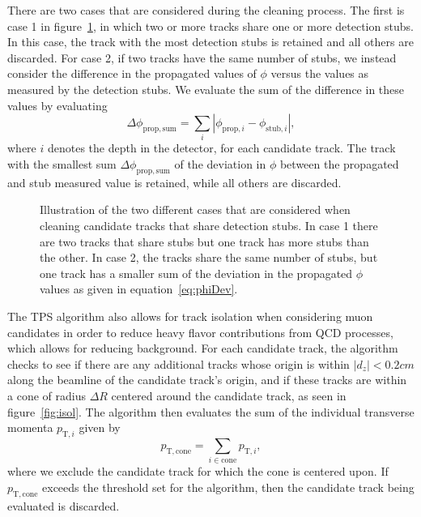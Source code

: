 There are two cases that are considered during the cleaning process.
The first is case 1 in figure~\ref{fig:clean}, in which two or more tracks share one or more detection stubs.
In this case, the track with the most detection stubs is retained and all others are discarded.
For case 2, if two tracks have the same number of stubs, we instead consider the difference in the propagated values of $\phi$ versus the values as measured by the detection stubs.
We evaluate the sum of the difference in these values by evaluating
\begin{equation}\label{eq:phiDev}
  \Delta\phi_{\mathrm{prop,sum}}=\sum_i|\phi_{\mathrm{prop},i}-\phi_{\mathrm{stub},i}|,
\end{equation}
where $i$ denotes the depth in the detector, for each candidate track.
The track with the smallest sum $\Delta\phi_{\mathrm{prop,sum}}$ of the deviation in $\phi$ between the propagated and stub measured value is retained, while all others are discarded.

\begin{figure}[htbp]
  \centering
  
  \caption{
    Illustration of the two different cases that are considered when cleaning candidate tracks that share detection stubs.
    In case 1 there are two tracks that share stubs but one track has more stubs than the other.
    In case 2, the tracks share the same number of stubs, but one track has a smaller sum of the deviation in the propagated $\phi$ values as given in equation~\ref{eq:phiDev}.
  }
  \label{fig:clean}
\end{figure}

The TPS algorithm also allows for track isolation when considering muon candidates in order to reduce heavy flavor contributions from QCD processes, which allows for reducing background.
For each candidate track, the algorithm checks to see if there are any additional tracks whose origin is within $|d_z|<0.2\unit{cm}$ along the beamline of the candidate track's origin, and if these tracks are within a cone of radius $\Delta R$ centered around the candidate track, as seen in figure~\ref{fig:isol}.
The algorithm then evaluates the sum of the individual transverse momenta $p_{\mathrm{T},i}$ given by
\begin{equation}\label{eq:ptCone}
  p_\mathrm{T,cone}=\sum_{i\in\mathrm{cone}}p_{\mathrm{T},i},
\end{equation}
where we exclude the candidate track for which the cone is centered upon.
If $p_\mathrm{T,cone}$ exceeds the threshold set for the algorithm, then the candidate track being evaluated is discarded.

